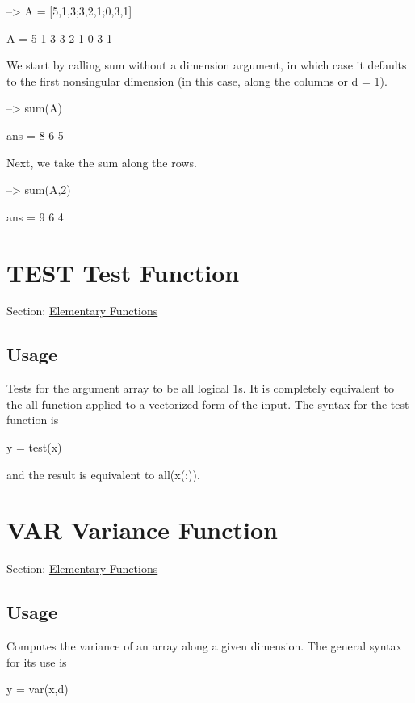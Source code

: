 \begin{DoxyVerbInclude}
--> A = [5,1,3;3,2,1;0,3,1]

A = 
 5 1 3 
 3 2 1 
 0 3 1 
\end{DoxyVerbInclude}


We start by calling {\ttfamily sum} without a dimension argument, in which case it defaults to the first nonsingular dimension (in this case, along the columns or {\ttfamily d = 1}).


\begin{DoxyVerbInclude}
--> sum(A)

ans = 
 8 6 5 
\end{DoxyVerbInclude}


Next, we take the sum along the rows.


\begin{DoxyVerbInclude}
--> sum(A,2)

ans = 
 9 
 6 
 4 
\end{DoxyVerbInclude}
 \hypertarget{elementary_test}{}\section{T\-E\-S\-T Test Function}\label{elementary_test}
Section\-: \hyperlink{sec_elementary}{Elementary Functions} \hypertarget{vtkwidgets_vtkxyplotwidget_Usage}{}\subsection{Usage}\label{vtkwidgets_vtkxyplotwidget_Usage}
Tests for the argument array to be all logical 1s. It is completely equivalent to the {\ttfamily all} function applied to a vectorized form of the input. The syntax for the {\ttfamily test} function is \begin{DoxyVerb}   y = test(x)
\end{DoxyVerb}
 and the result is equivalent to {\ttfamily all(x(\-:))}. \hypertarget{elementary_var}{}\section{V\-A\-R Variance Function}\label{elementary_var}
Section\-: \hyperlink{sec_elementary}{Elementary Functions} \hypertarget{vtkwidgets_vtkxyplotwidget_Usage}{}\subsection{Usage}\label{vtkwidgets_vtkxyplotwidget_Usage}
Computes the variance of an array along a given dimension. The general syntax for its use is \begin{DoxyVerb}  y = var(x,d)
\end{DoxyVerb}
